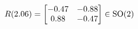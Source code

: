 \documentclass[preview]{standalone}
\begin{document}
\begin{align*}
\special{dvisvgm:raw <g id='unique000'>}R(2.06) = \begin{bmatrix} -0.47 & -0.88 \\ 0.88 & -0.47 \end{bmatrix} \in \text{SO}(2)\special{dvisvgm:raw </g>}
\end{align*}
\end{document}
